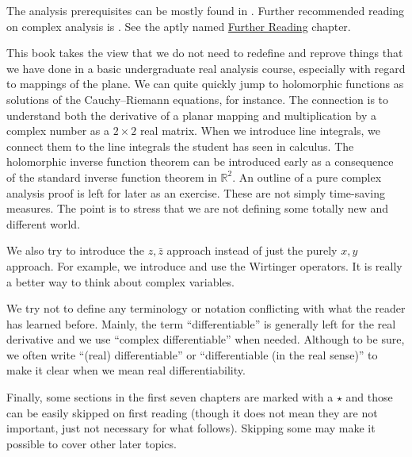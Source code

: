 \documentclass[12pt,openany]{book}
\newcommand{\R}{{\mathbb{R}}}
\newcommand{\myquote}[1]{``#1''}
\theoremstyle{plain}
\theoremstyle{remark}
\theoremstyle{definition}
\theoremstyle{exercise}
\theoremstyle{example}
\begin{document}
The analysis prerequisites can be mostly found in
\cites{ra:book,ra:book2,Rudin:principles}.  Further recommended
reading on complex analysis is \cites{Boas,Conway1,Conway2,Rudin,Ullrich}.
See the aptly named
\hyperref[ch:furtherreading]{Further Reading} chapter.

This book takes the view that we do not need to redefine and reprove
things that we have done in a basic undergraduate real analysis course,
especially with
regard to mappings of the plane.  We can quite quickly jump to
holomorphic functions as solutions of the Cauchy--Riemann equations,
for instance.
The connection is to understand both the derivative of 
a planar mapping and
multiplication by a complex number
as a $2 \times 2$ real matrix.
When we introduce line integrals, we connect
them to the line integrals the student has seen in calculus.
The holomorphic inverse function theorem can be introduced early as
a consequence of the standard inverse function theorem in $\R^2$.
An outline of a pure complex analysis proof is left for later as an exercise.
These are not simply time-saving measures.
The point is to stress that we are not defining some totally new and
different world.

We also try to introduce the $z,\bar{z}$ approach instead of just the
purely $x,y$ approach.  For example, we introduce and use the Wirtinger
operators.
It is really a better way to think about complex variables.

We try not to define any terminology or notation
conflicting 
with what the reader has learned before.
Mainly, the term \myquote{differentiable} is generally left for the real
derivative and we use \myquote{complex differentiable} when needed.  Although
to be sure, 
we often write \myquote{(real) differentiable} or
\myquote{differentiable (in the real sense)} to
make it clear when we mean real differentiability.

Finally, some sections in the first seven chapters are marked with a $\star$ and those
can be easily skipped on first reading (though it does not mean they are not
important, just not necessary for what follows).  Skipping some may make it
possible to cover other later topics.

\medskip
\end{document}
